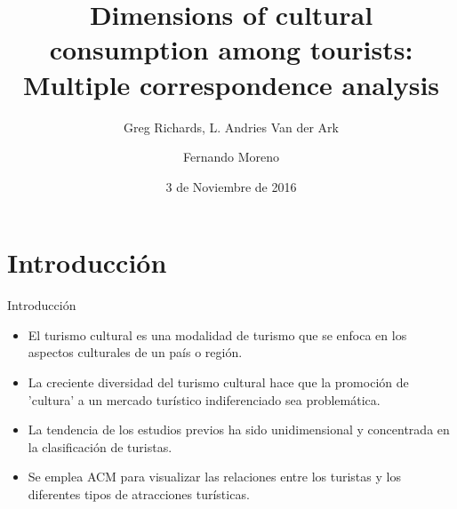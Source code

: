 \documentclass[12pt]{beamer}
\author{Fernando Moreno}
\title{Dimensions of cultural consumption among tourists: Multiple correspondence analysis}
\subtitle{Greg Richards, L. Andries Van der Ark}
\institute{Universidad Nacional de Colombia}
\date{3 de Noviembre de 2016}
\begin{document}
	\maketitle 	
	\begin{center}
	\hspace{1.5cm}
	\tableofcontents
    \end{center}
	\clearpage
	\section{Introducción}
\begin{center}
	\begin{flushleft}
		Introducción \\		
	\end{flushleft}
\end{center}
\begin{itemize}
\item El turismo cultural es una modalidad de turismo que se enfoca en los aspectos culturales de un país o región.
\item La creciente diversidad del turismo cultural hace que la promoción de 'cultura' a un mercado turístico indiferenciado sea problemática.
\item La tendencia de los estudios previos ha sido unidimensional y concentrada en la clasificación de turistas.
\item Se emplea ACM para visualizar las relaciones entre los turistas y los diferentes tipos de atracciones turísticas.
\end{itemize} 
\clearpage
\end{document}
